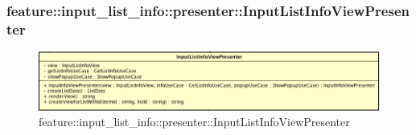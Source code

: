 \subsubsection{feature::input\_list\_info::presenter::InputListInfoViewPresenter}

\label{feature::input_list_info::presenter::InputListInfoViewPresenter}
\begin{figure}[H]
	\centering
	\includegraphics[scale=0.5]{Sezioni/SottosezioniST/img/app/InputListInfoViewPresenter.png}
	\caption{feature::input\_list\_info::presenter::InputListInfoViewPresenter}
\end{figure}

